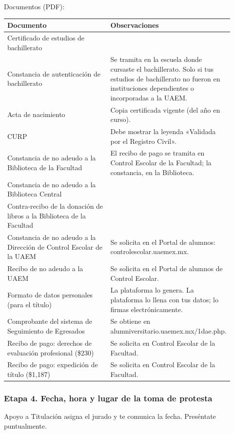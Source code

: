 Documentos (PDF):
{\small\begin{longtable}{>{\raggedright\arraybackslash}p{0.47\linewidth}>{\raggedright\arraybackslash}p{0.45\linewidth}}
\toprule
\textbf{Documento} & \textbf{Observaciones}\\
\midrule
\endhead
Certificado de estudios de bachillerato & \\
Constancia de autenticación de bachillerato & Se tramita en la escuela donde cursaste el bachillerato. Solo si tus estudios de bachillerato no fueron en instituciones dependientes o incorporadas a la UAEM.\\
Acta de nacimiento & Copia certificada vigente (del año en curso).\\
CURP & Debe mostrar la leyenda «Validada por el Registro Civil».\\
Constancia de no adeudo a la Biblioteca de la Facultad & El recibo de pago se tramita en Control Escolar de la Facultad; la constancia, en la Biblioteca.\\
Constancia de no adeudo a la Biblioteca Central & \\
Contra-recibo de la donación de libros a la Biblioteca de la Facultad & \\
Constancia de no adeudo a la Dirección de Control Escolar de la UAEM & Se solicita en el Portal de alumnos: controlescolar.uaemex.mx.\\
Recibo de no adeudo a la UAEM & Se solicita en el Portal de alumnos de Control Escolar.\\
Formato de datos personales (para el título) & La plataforma lo genera. La plataforma lo llena con tus datos; lo firmas electrónicamente.\\
Comprobante del sistema de Seguimiento de Egresados & Se obtiene en alumniversitario.uaemex.mx/1dae.php.\\
Recibo de pago: derechos de evaluación profesional (\$230) & Se solicita en Control Escolar de la Facultad.\\
Recibo de pago: expedición de título (\$1,187) & Se solicita en Control Escolar de la Facultad.\\
\bottomrule
\end{longtable}}
\subsubsection*{Etapa 4. Fecha, hora y lugar de la toma de protesta}
Apoyo a Titulación asigna el jurado y te comunica la fecha. Preséntate puntualmente.

